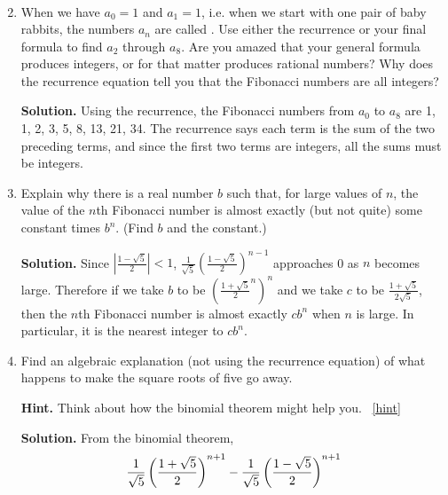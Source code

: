 \documentclass{book}
\begin{document}
\begin{activity}[]
\begin{enumerate}[font=\bfseries,label=(\alph*),ref=\alph*]
\begin{align*}
\end{align*}
%
\item\label{task-250} \hypertarget{p-1389}{}%
When we have \(a_0=1\) and \(a_1=1\), i.e. when we start with one pair of baby rabbits, the numbers \(a_n\) are called .  Use either the recurrence or your final formula to find \(a_2\) through \(a_8\).  Are you amazed that your general formula produces integers, or for that matter produces rational numbers?  Why does the recurrence equation tell you that the Fibonacci numbers are all integers?%
\par\smallskip%
\noindent\textbf{Solution.}\hypertarget{solution-172}{}\quad%
\hypertarget{p-1390}{}%
Using the recurrence, the Fibonacci numbers from \(a_0\) to \(a_8\) are 1, 1, 2, 3, 5, 8, 13, 21, 34. The recurrence says each term is the sum of the two preceding terms, and since the first two terms are integers, all the sums must be integers.%
\item\label{task-251} \hypertarget{p-1391}{}%
Explain why there is a real number \(b\) such that, for large values of \(n\), the value of the \(n\)th Fibonacci number is almost exactly (but not quite) some constant times \(b^n\). (Find \(b\) and the constant.)%
\par\smallskip%
\noindent\textbf{Solution.}\hypertarget{solution-173}{}\quad%
\hypertarget{p-1392}{}%
Since \(\displaystyle \left|\frac{1-\sqrt{5}}{2}\right| \lt 1\), \(\displaystyle\frac{1}{\sqrt{5}}\left(\frac{1-\sqrt{5}}{2}\right)^{n-1}\) approaches 0 as \(n\) becomes large. Therefore if we take \(b\) to be \(\displaystyle \left(\frac{1+\sqrt{5}}{2}^n\right)^n\) and we take \(c\) to be \(\frac{1+\sqrt{5}}{2\sqrt{5}}\), then the \(n\)th Fibonacci number is almost exactly \(cb^n\) when \(n\) is large. In particular, it is the nearest integer to \(cb^n\).%
\item\label{task-252} \hypertarget{p-1393}{}%
Find an algebraic explanation (not using the recurrence equation) of what happens to make the square roots of five go away.%
\par\smallskip%
\noindent\textbf{Hint.}\hypertarget{hint-173}{}\quad%
\hypertarget{p-1394}{}%
Think about how the binomial theorem might help you.%
~\hfill{\tiny\hyperlink{a-269.d}{[hint]}\hypertarget{q-269.d}{}}\par\smallskip%
\noindent\textbf{Solution.}\hypertarget{solution-174}{}\quad%
\hypertarget{p-1395}{}%
From the binomial theorem,%
\begin{align*}
\amp \frac{1}{\sqrt{5}}\left(\frac{1+\sqrt{5}}{   2}\right)^{n+1}- \frac{1}{\sqrt{5}}\left(\frac{1-\sqrt{5}}{2}\right)^{n+1}\\

\end{align*}
\end{enumerate}
\end{activity}
\end{document}
